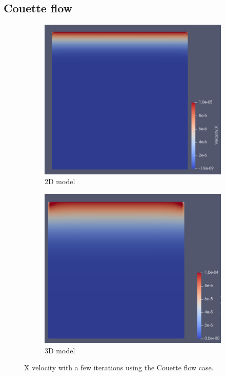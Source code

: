 \documentclass[12pt]{book}
\begin{document}
\subsection{Couette flow}
\begin{figure}[H]
	\centering
	\begin{subfigure}{.49\textwidth}
		\includegraphics[width=\linewidth]{Resources/Images/couette.png}
		\caption{2D model}
	\end{subfigure}
	\begin{subfigure}{.49\textwidth}
		\includegraphics[width=\linewidth]{Resources/Images/couette3D.png}
		\caption{3D model}
	\end{subfigure} 
	\caption{X velocity with a few iterations using the Couette flow case.}
	\label{fig:couette}
\end{figure} 
\end{document}
